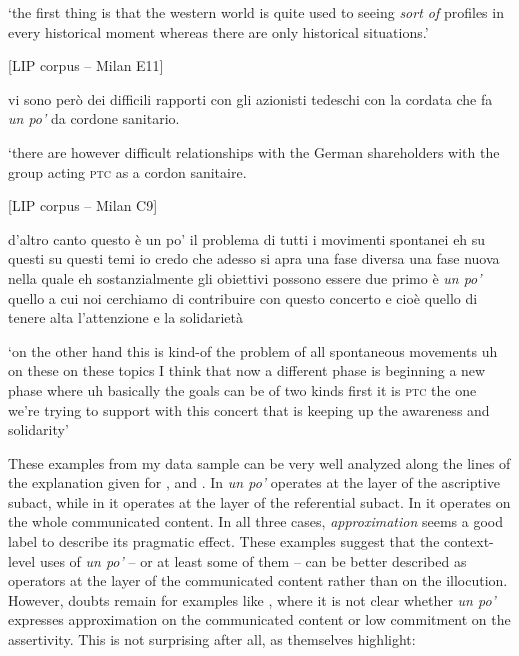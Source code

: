 \glt ‘the first thing is that the western world is quite used to seeing \textit{sort of} profiles in every historical moment whereas there are only historical situations.’
    \z %

\ea%
    \label{ex:key:84}

          [LIP corpus – Milan E11]

vi sono però dei difficili rapporti con gli azionisti tedeschi con la cordata che fa \textit{un po’} da cordone sanitario.

\glt ‘there are however difficult relationships with the German shareholders with the group acting \textsc{ptc} as a cordon sanitaire.
    \z %

\ea%
    \label{ex:key:85}

          [LIP corpus – Milan C9]

d’altro canto questo è un po’ il problema di tutti i movimenti spontanei eh su questi su questi temi io credo che adesso si apra una fase diversa una fase nuova nella quale eh sostanzialmente gli obiettivi possono essere due primo è \textit{un po’} quello a cui noi cerchiamo di contribuire con questo concerto e cioè quello di tenere alta l’attenzione e la solidarietà

\glt ‘on the other hand this is kind-of the problem of all spontaneous movements uh on these on these topics I think that now a different phase is beginning a new phase where uh basically the goals can be of two kinds first it is \textsc{ptc} the one we’re trying to support with this concert that is keeping up the awareness and solidarity’
    \z %

These examples from my data sample can be very well analyzed along the lines of the explanation given for ,  and . In  \textit{un po’} operates at the layer of the ascriptive subact, while in  it operates at the layer of the referential subact. In  it operates on the whole communicated content. In all three cases, \textit{approximation} seems a good label to describe its pragmatic effect. These examples suggest that the context-level uses of \textit{un po’} – or at least some of them – can be better described as operators at the layer of the communicated content rather than on the illocution. However, doubts remain for examples like , where it is not clear whether \textit{un po’} expresses approximation on the communicated content or low commitment on the assertivity. This is not surprising after all, as \citet{HengeveldKeizer2011} themselves highlight:

